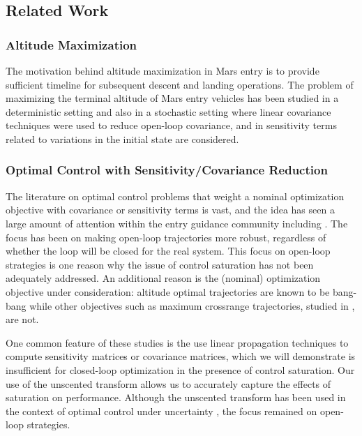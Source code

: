 \documentclass[journal ]{new-aiaa}
\begin{document}
\subsection*{Related Work}
\subsubsection*{Altitude Maximization}
The motivation behind altitude maximization in Mars entry is to provide sufficient timeline for subsequent descent and landing operations. The problem of maximizing the terminal altitude of Mars entry vehicles has been studied in a deterministic setting
\cite{AltitudeOptimization} %
\cite{AltitudeOptimizationIndirect}
\cite{GuangfeiDissertation}
and also in a stochastic setting \cite{AltitudeUnderUncertainty} where linear covariance techniques were used to reduce open-loop covariance, and in \cite{MarsEntryDesensitized} sensitivity terms related to variations in the initial state are considered.

\subsubsection*{Optimal Control with Sensitivity/Covariance Reduction}
The literature on optimal control problems that weight a nominal optimization objective with covariance or sensitivity terms is vast, and the idea has seen a large amount of attention within the entry guidance community including \cite{AltitudeUnderUncertainty, MarsEntryDesensitized, EntryOUUThesis1, EntryOUUThesis2, EntryOUU}.
The focus has been on making open-loop trajectories more robust, regardless of whether the loop will be closed for the real system. This focus on open-loop strategies is one reason why the issue of control saturation has not been adequately addressed. An additional reason is the (nominal) optimization objective under consideration: altitude optimal trajectories are known to be bang-bang \cite{AltitudeOptimization} while other objectives such as maximum crossrange trajectories, studied in \cite{EntryOUUThesis2}, are not.  

One common feature of these studies is the use linear propagation techniques to compute sensitivity matrices or covariance matrices, which we will demonstrate is insufficient for closed-loop optimization in the presence of control saturation. Our use of the unscented transform allows us to accurately capture the effects of saturation on performance. Although the unscented transform has been used in the context of optimal control under uncertainty \cite{UnscentedOptimalControl}, the focus remained on open-loop strategies. 
\end{document}
